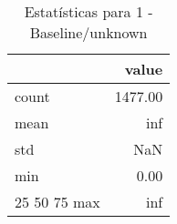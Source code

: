 \begin{table}[htbp]
\caption{Estatísticas para 1 - Baseline/unknown}
\label{tab:1_-_baseline_unknown_summary}
\begin{tabular}{lr}
\toprule
 & value \\
\midrule
count & 1477.00 \\
mean & inf \\
std & NaN \\
min & 0.00 \\
25%
50%
75%
max & inf \\
\bottomrule
\end{tabular}
\end{table}
